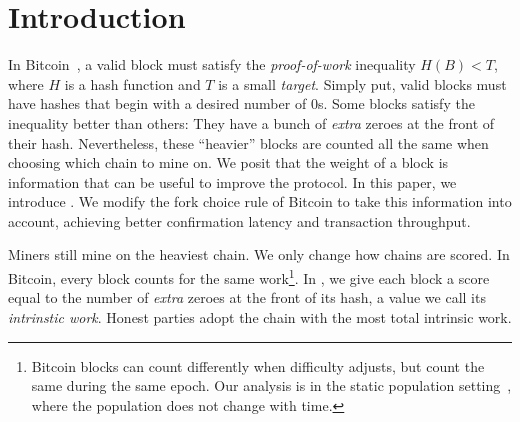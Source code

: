 \section{Introduction}

In Bitcoin~\cite{bitcoin}, a valid block must satisfy the
\emph{proof-of-work} inequality $H(B) < T$, where
$H$ is a hash function and $T$ is a small \emph{target}.
Simply put, valid blocks must have hashes that begin with a desired number of $0$s.
Some blocks satisfy the inequality better than others:
They have a bunch of \emph{extra} zeroes at the front of their hash.
Nevertheless, these ``heavier'' blocks are counted all the same when choosing
which chain to mine on.
We posit that the weight of a block is information
that can be useful to improve the protocol.
In this paper, we introduce \emph{\poem}.
We modify the fork choice rule of Bitcoin to take this information into account,
achieving better confirmation latency and transaction throughput.

\noindent
{}
Miners still mine on the heaviest chain. We only change how chains are scored.
In Bitcoin, every block counts for the same work\footnote{Bitcoin blocks can count differently when
difficulty adjusts, but count the same during the same epoch. Our analysis is in the
static population setting~\cite{backbone}, where the population does not change with time.}.
In \poem, we give each block a score equal to the number of \emph{extra} zeroes at the front of its hash,
a value we call its \emph{intrinstic work}. Honest parties adopt the chain with the most total
intrinsic work.

